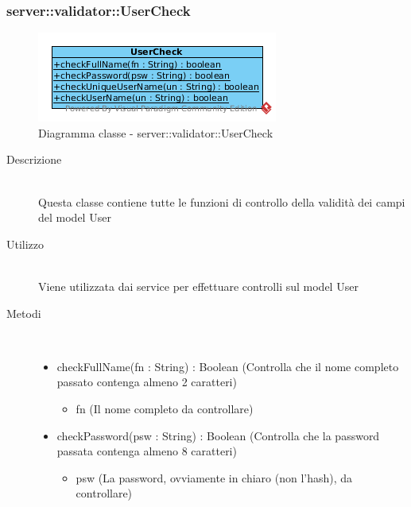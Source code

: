 \subsubsection[UserCheck]{server::validator::UserCheck}
\begin{center}
			\begin{figure}[H]
				\centering \includegraphics[scale=4, max width=\textwidth, max height=\myheight]{../img/diagrammiClassi/server/validator/UserCheck.png}
				\caption{Diagramma classe - server::validator::UserCheck}
			\end{figure}
		\end{center}\begin{description}
\item[Descrizione] \hfill \\
 Questa classe contiene tutte le funzioni di controllo della validità dei campi del model User
\item[Utilizzo] \hfill \\
 Viene utilizzata dai service per effettuare controlli sul model User
\item[Metodi] \hfill \\
 \vspace{-7mm}
\begin{itemize}
\item checkFullName(fn : String) : Boolean (Controlla che il nome completo passato contenga almeno 2 caratteri)\begin{itemize}
\item fn (Il nome completo da controllare)
\end{itemize}

\item checkPassword(psw : String) : Boolean (Controlla che la password passata contenga almeno 8 caratteri)\begin{itemize}
\item psw (La password, ovviamente in chiaro (non l'hash), da controllare)
\end{itemize}


\end{itemize}
\end{description}
